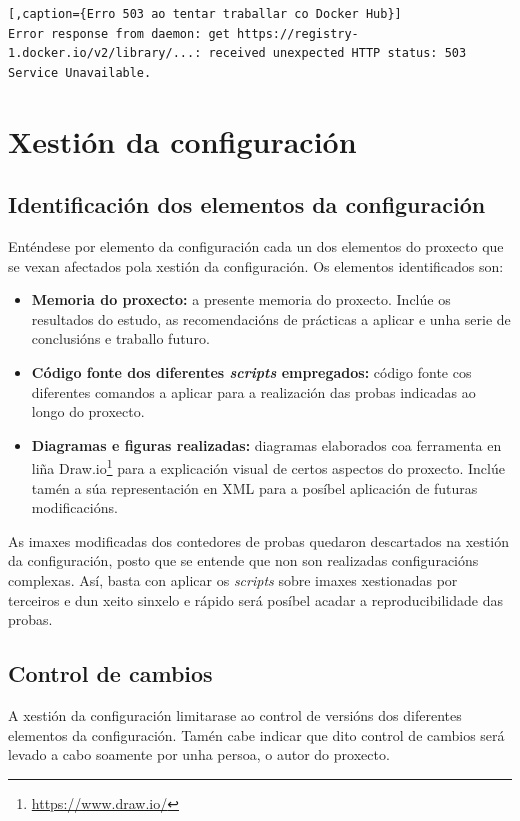 \begin{lstlisting}[,caption={Erro 503 ao tentar traballar co Docker Hub}]
Error response from daemon: get https://registry-1.docker.io/v2/library/...: received unexpected HTTP status: 503 Service Unavailable.
\end{lstlisting}

\section{Xestión da configuración}

\subsection{Identificación dos elementos da configuración}

Enténdese por elemento da configuración cada un dos elementos do proxecto que se vexan afectados pola xestión da configuración. Os elementos identificados son:

\begin{itemize}
    \item \textbf{Memoria do proxecto:} a presente memoria do proxecto. Inclúe os resultados do estudo, as recomendacións de prácticas a aplicar e unha serie de conclusións e traballo futuro.
    \item \textbf{Código fonte dos diferentes \textit{scripts} empregados:} código fonte cos diferentes comandos a aplicar para a realización das probas indicadas ao longo do proxecto.
    \item \textbf{Diagramas e figuras realizadas:} diagramas elaborados coa ferramenta en liña Draw.io\footnote{\url{https://www.draw.io/}} para a explicación visual de certos aspectos do proxecto. Inclúe tamén a súa representación en \gls{XML} para a posíbel aplicación de futuras modificacións.
\end{itemize}

As imaxes modificadas dos contedores de probas quedaron descartados na xestión da configuración, posto que se entende que non son realizadas configuracións complexas. Así, basta con aplicar os \textit{scripts} sobre imaxes xestionadas por terceiros e dun xeito sinxelo e rápido será posíbel acadar a reproducibilidade das probas.

\subsection{Control de cambios}

A xestión da configuración limitarase ao control de versións dos diferentes elementos da configuración. Tamén cabe indicar que dito control de cambios será levado a cabo soamente por unha persoa, o autor do proxecto. 

